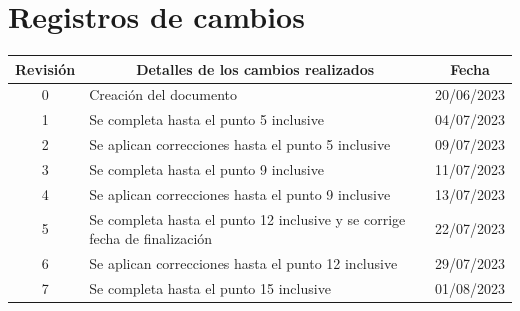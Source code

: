 \documentclass[
11pt, %
]{charter}
\begin{document}
\maketitle
\thispagestyle{empty}
\pagebreak


\thispagestyle{empty}
{\setlength{\parskip}{0pt}
\tableofcontents{}
}
\pagebreak


\section*{Registros de cambios}
\label{sec:registro}


\begin{table}[ht]
\label{tab:registro}
\centering
\begin{tabularx}{\linewidth}{@{}|c|X|c|@{}}
\hline
\rowcolor[HTML]{C0C0C0} 
Revisión & \multicolumn{1}{c|}{\cellcolor[HTML]{C0C0C0}Detalles de los cambios realizados} & Fecha      \\ \hline
0      & Creación del documento                                 & 20/06/2023 \\ \hline
1      & Se completa hasta el punto 5 inclusive                 & 04/07/2023 \\ \hline
2          & Se aplican correcciones hasta el punto 5 inclusive                  & 09/07/2023 \\ \hline
3          & Se completa hasta el punto 9 inclusive                 & 11/07/2023 \\ \hline
4          & Se aplican correcciones hasta el punto 9 inclusive                & 13/07/2023 \\ \hline
5          & Se completa hasta el punto 12 inclusive y se corrige fecha de finalización & 22/07/2023 \\ \hline
6          & Se aplican correcciones hasta el punto 12 inclusive & 29/07/2023 \\ \hline
7          & Se completa hasta el punto 15 inclusive & 01/08/2023 \\ \hline

\end{tabularx}
\end{table}
\end{document}
